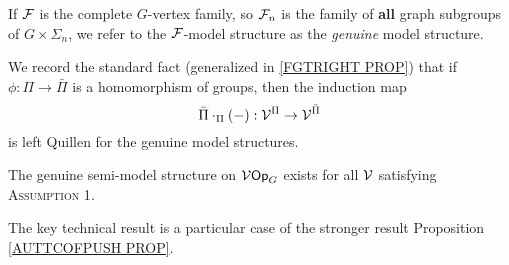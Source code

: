 \documentclass[a4paper,10pt]{article}%
\begin{document}
\begin{definition} 
 If $\mathcal F$ is the complete $G$-vertex family, so $\mathcal F_n$ is the family of \textbf{all} graph subgroups of $G\times \Sigma_n$, we refer to the $\mathcal F$-model structure as the \textit{genuine} model structure. 
\end{definition} 

 \begin{remark}\label{GENUINE FGTRIGHT REMARK} 
 We record the standard fact (generalized in \ref{FGTRIGHT PROP}) that if $\phi: \Pi \to \bar \Pi$ is a homomorphism of groups, then the induction map 
 \[ 
 \bar\Pi\cdot_\Pi(-): \mathcal V^\Pi \to \mathcal V^{\bar \Pi} 
 \] 
 is left Quillen for the genuine model structures. 
\end{remark} 

\begin{theorem}\label{GENUINE_SEMI_VOP_G_THM} 
 The genuine semi-model structure on $\mathcal V\mathsf{Op}_G$ exists for all $\mathcal V$ satisfying \textsc{Assumption 1}. 
\end{theorem} 
 
The key technical result is a particular case of the stronger result Proposition \ref{AUTTCOFPUSH PROP}.  
\end{document}
